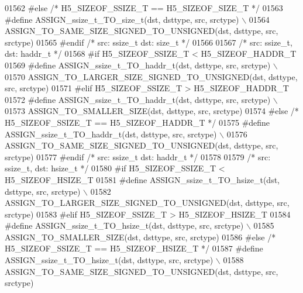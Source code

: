 \begin{DoxyCode}
01562 \textcolor{preprocessor}{#else }\textcolor{comment}{/* H5\_SIZEOF\_SSIZE\_T == H5\_SIZEOF\_SIZE\_T */}\textcolor{preprocessor}{}
01563 \textcolor{preprocessor}{    #define ASSIGN\_ssize\_t\_TO\_size\_t(dst, dsttype, src, srctype) \(\backslash\)}
01564 \textcolor{preprocessor}{        ASSIGN\_TO\_SAME\_SIZE\_SIGNED\_TO\_UNSIGNED(dst, dsttype, src, srctype)}
01565 \textcolor{preprocessor}{#endif }\textcolor{comment}{/* src: ssize\_t dst: size\_t */}\textcolor{preprocessor}{}
01566 
01567 \textcolor{comment}{/* src: ssize\_t, dst: haddr\_t */}
01568 \textcolor{preprocessor}{#if H5\_SIZEOF\_SSIZE\_T < H5\_SIZEOF\_HADDR\_T}
01569 \textcolor{preprocessor}{    #define ASSIGN\_ssize\_t\_TO\_haddr\_t(dst, dsttype, src, srctype) \(\backslash\)}
01570 \textcolor{preprocessor}{        ASSIGN\_TO\_LARGER\_SIZE\_SIGNED\_TO\_UNSIGNED(dst, dsttype, src, srctype)}
01571 \textcolor{preprocessor}{#elif H5\_SIZEOF\_SSIZE\_T > H5\_SIZEOF\_HADDR\_T}
01572 \textcolor{preprocessor}{    #define ASSIGN\_ssize\_t\_TO\_haddr\_t(dst, dsttype, src, srctype) \(\backslash\)}
01573 \textcolor{preprocessor}{        ASSIGN\_TO\_SMALLER\_SIZE(dst, dsttype, src, srctype)}
01574 \textcolor{preprocessor}{#else }\textcolor{comment}{/* H5\_SIZEOF\_SSIZE\_T == H5\_SIZEOF\_HADDR\_T */}\textcolor{preprocessor}{}
01575 \textcolor{preprocessor}{    #define ASSIGN\_ssize\_t\_TO\_haddr\_t(dst, dsttype, src, srctype) \(\backslash\)}
01576 \textcolor{preprocessor}{        ASSIGN\_TO\_SAME\_SIZE\_SIGNED\_TO\_UNSIGNED(dst, dsttype, src, srctype)}
01577 \textcolor{preprocessor}{#endif }\textcolor{comment}{/* src: ssize\_t dst: haddr\_t */}\textcolor{preprocessor}{}
01578 
01579 \textcolor{comment}{/* src: ssize\_t, dst: hsize\_t */}
01580 \textcolor{preprocessor}{#if H5\_SIZEOF\_SSIZE\_T < H5\_SIZEOF\_HSIZE\_T}
01581 \textcolor{preprocessor}{    #define ASSIGN\_ssize\_t\_TO\_hsize\_t(dst, dsttype, src, srctype) \(\backslash\)}
01582 \textcolor{preprocessor}{        ASSIGN\_TO\_LARGER\_SIZE\_SIGNED\_TO\_UNSIGNED(dst, dsttype, src, srctype)}
01583 \textcolor{preprocessor}{#elif H5\_SIZEOF\_SSIZE\_T > H5\_SIZEOF\_HSIZE\_T}
01584 \textcolor{preprocessor}{    #define ASSIGN\_ssize\_t\_TO\_hsize\_t(dst, dsttype, src, srctype) \(\backslash\)}
01585 \textcolor{preprocessor}{        ASSIGN\_TO\_SMALLER\_SIZE(dst, dsttype, src, srctype)}
01586 \textcolor{preprocessor}{#else }\textcolor{comment}{/* H5\_SIZEOF\_SSIZE\_T == H5\_SIZEOF\_HSIZE\_T */}\textcolor{preprocessor}{}
01587 \textcolor{preprocessor}{    #define ASSIGN\_ssize\_t\_TO\_hsize\_t(dst, dsttype, src, srctype) \(\backslash\)}
01588 \textcolor{preprocessor}{        ASSIGN\_TO\_SAME\_SIZE\_SIGNED\_TO\_UNSIGNED(dst, dsttype, src, srctype)}

\end{DoxyCode}
